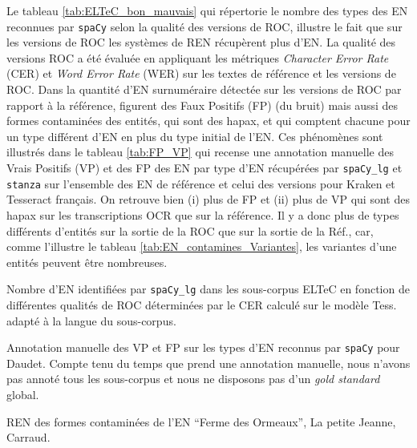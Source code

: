 Le tableau \ref{tab:ELTeC_bon_mauvais} qui répertorie le nombre des types des EN reconnues par \texttt{spaCy} selon la qualité des versions de ROC, illustre le fait que sur les versions de ROC les systèmes de REN récupèrent plus d'EN. La qualité des versions ROC a été évaluée en appliquant les métriques \textit{Character Error Rate} (CER) et \textit{Word Error Rate} (WER) sur les textes de référence et les versions de ROC.
Dans la quantité d'EN surnuméraire détectée sur les versions de ROC par rapport à la référence, figurent des Faux Positifs (FP) (du bruit) mais aussi des formes contaminées des entités, qui sont des hapax, et qui comptent chacune pour un type différent d'EN en plus du type initial de l'EN. Ces phénomènes sont illustrés dans le tableau \ref{tab:FP_VP} qui recense une annotation manuelle des Vrais Positifs (VP) et des FP des EN par type d'EN récupérées par \texttt{spaCy\_lg} et \texttt{stanza} sur l'ensemble des EN de référence et celui des versions pour Kraken et Tesseract français. On retrouve bien (i) plus de FP et (ii) plus de VP qui sont des hapax sur les transcriptions OCR que sur la référence. Il y a donc plus de types différents d'entités sur la sortie de la ROC que sur la sortie de la Réf., car, comme l'illustre le tableau \ref{tab:EN_contamines_Variantes}, les variantes d'une entités peuvent être nombreuses. 

\begin{table}[h!]
    \centering
    \small
    
    \caption{Nombre d'EN identifiées par \texttt{spaCy\_lg} dans les sous-corpus ELTeC  en fonction de différentes qualités de ROC déterminées par le CER calculé sur le modèle Tess. adapté à la langue du sous-corpus. 
    }
    \label{tab:ELTeC_bon_mauvais}
\end{table}

\begin{table}[h!]
\small
    \centering
    
    \caption{Annotation manuelle des VP et FP sur les types d'EN reconnus par \texttt{spaCy} pour Daudet. Compte tenu du temps que prend une annotation manuelle, nous n'avons pas annoté tous les sous-corpus et nous ne disposons pas d'un \textit{gold standard} global.}
    \label{tab:FP_VP}
\end{table}



\begin{table}[h!]
\small
    \centering
    
    \caption{REN des formes contaminées de l'EN ``Ferme des Ormeaux'', {\normalfont La petite Jeanne}, Carraud.}
    \label{tab:EN_contamines_Variantes}
\end{table}

